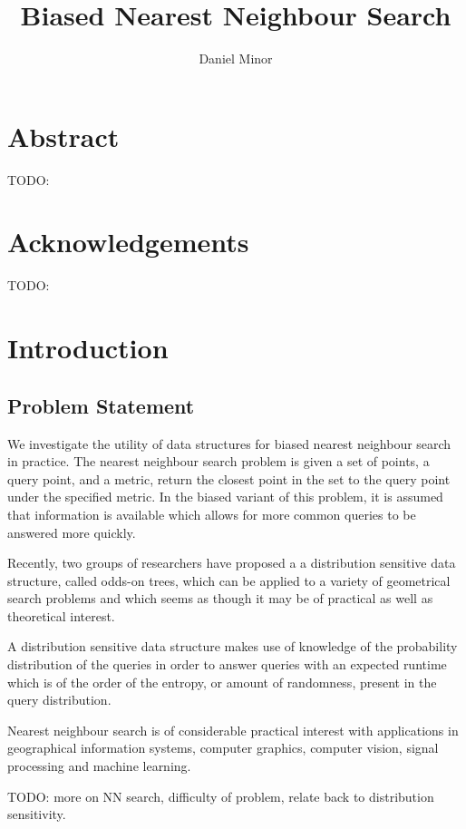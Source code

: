 \documentclass[mcs]{scsthesis}
\title {Biased Nearest Neighbour Search}
\author {Daniel Minor}
\begin{document}
\newtheorem*{thm}{Theorem}[section]

\beforepreface

\prefacesection

\chapter*{Abstract}

TODO:

\chapter*{Acknowledgements}

TODO:

\afterpreface

\chapter{Introduction}

\section{Problem Statement}

We investigate the utility of data structures for biased nearest neighbour
search in practice.   The nearest neighbour search problem is given a set of
points, a query point, and a metric, return the closest point in the set to the
query point under the specified metric.  In the biased variant of this problem,
it is assumed that information is available which allows for more common queries
to be answered more quickly.

Recently, two groups of researchers \cite{chan} \cite{oddson} have proposed a
a distribution sensitive data structure, called odds-on trees,  which can be
applied to a variety of geometrical search problems and which seems as though it
may be of practical as well as theoretical interest.

A distribution sensitive data structure makes use of knowledge of the
probability distribution of the queries in order to answer queries with an
expected runtime which is of the order of the entropy, or amount of randomness,
present in the query distribution. 

Nearest neighbour search is of considerable practical interest with
applications in geographical information systems, computer graphics,
computer vision, signal processing and machine learning.

TODO: more on NN search, difficulty of problem, relate back to distribution
sensitivity.
\end{document}
